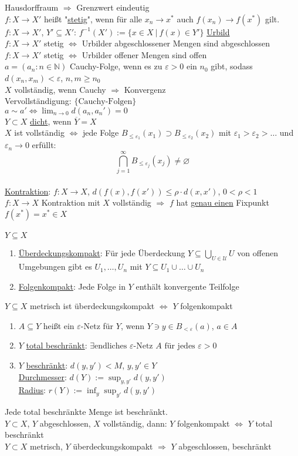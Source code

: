 \documentclass[a4paper]{article}
\newcommand{\ul}{\underline}
\let\epsilon\varepsilon
\begin{document}
Hausdorffraum $\Rightarrow$ Grenzwert eindeutig\\
$f:X\rightarrow X'$ heißt "\ul{stetig}", wenn für alle $x_n\rightarrow x^*$ auch $f(x_n)\rightarrow f(x^*)$ gilt.\\
$f:X\rightarrow X'$, $Y'\subseteq X'$: $f^{-1}(X'):=\{x\in X\ \vert\ f(x)\in Y'\}$ \ul{Urbild}\\
$f:X\rightarrow X'$ stetig $\Leftrightarrow$ Urbilder abgeschlossener Mengen sind abgeschlossen\\
$f:X\rightarrow X'$ stetig $\Leftrightarrow$ Urbilder offener Mengen sind offen\\
$a=(a_n:n\in\mathbb{N})$ Cauchy-Folge, wenn es zu $\epsilon>0$ ein $n_0$ gibt, sodass $d(x_n,x_m)<\epsilon$, $n,m\geq n_0$\\
$X$ vollständig, wenn Cauchy $\Rightarrow$ Konvergenz\\
Vervollständigung: $\{\text{Cauchy-Folgen}\}$\\
$a\sim a'\Leftrightarrow \lim_{n\rightarrow 0}d(a_n,a_n')=0$\\
$Y\subset X$ \ul{dicht}, wenn $\overline{Y}=X$\\
$X$ ist vollständig $\Leftrightarrow$ jede Folge $B_{\leq \epsilon_1}(x_1)\supset B_{\leq \epsilon_2}(x_2)$ mit $\epsilon_1>\epsilon_2>\dots$ und $\epsilon_n\rightarrow 0$ erfüllt:
$$\bigcap_{j=1}^\infty B_{\leq \epsilon_j}(x_j)\neq\varnothing$$\\
\ul{Kontraktion}: $f:X\rightarrow X$, $d(f(x),f(x'))\leq \rho\cdot d(x,x')$, $0<\rho<1$\\
$f:X\rightarrow X$ Kontraktion mit $X$ vollständig $\Rightarrow$ $f$ hat \ul{genau einen} Fixpunkt $f(x^*)=x^*\in X$\\\\
$Y\subseteq X$
\begin{enumerate}[1)]
	\item \ul{Überdeckungskompakt}: Für jede Überdeckung $Y\subseteq\bigcup_{U\in \mathcal{U}}U$ von offenen Umgebungen gibt es $U_1,\dots,U_n$ mit $Y\subseteq U_1\cup\dots\cup U_n$
	\item \ul{Folgenkompakt}: Jede Folge in $Y$ enthält konvergente Teilfolge
\end{enumerate}
$Y\subseteq X$ metrisch ist überdeckungskompakt $\Leftrightarrow$ $Y$ folgenkompakt\\
\begin{enumerate}[1)]
	\item $A\subseteq Y$ heißt ein $\epsilon$-Netz für $Y$, wenn $Y\ni y\in B_{<\epsilon}(a)$, $a\in A$
	\item $Y$ \ul{total beschränkt}: $\exists \text{endliches }\epsilon\text{-Netz }A\text{ für jedes }\epsilon>0$
	\item $Y$ \ul{beschränkt}: $d(y,y')<M$, $y,y'\in Y$\\
	\ul{Durchmesser}: $d(Y):=\sup_{y,y'}d(y,y')$\\
	\ul{Radius}: $r(Y):=\inf_y\sup_{y'}d(y,y')$
\end{enumerate}
Jede total beschränkte Menge ist beschränkt.\\
$Y\subset X$, $Y$ abgeschlossen, $X$ vollständig, dann: $Y$ folgenkompakt $\Leftrightarrow$ $Y$ total beschränkt\\
$Y\subset X$ metrisch, $Y$ überdeckungskompakt $\Rightarrow$ $Y$ abgeschlossen, beschränkt
\end{document}
